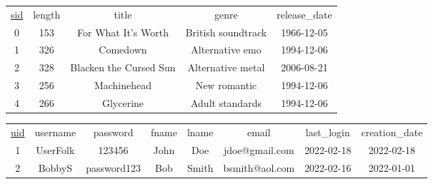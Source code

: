 \documentclass[12pt]{article}
\begin{document}
    \begin{center}
        \begin{tabular}{ |c|c|c|c|c| }
            \hline
            \rowcolor{tablegrey} \multicolumn{5}{|c|}{Song} \\
            \hline
            \underline{sid} & length & title & genre & release\_date \\
            \hline
            0 & 153 & For What It's Worth & British soundtrack & 1966-12-05 \\
            \hline
            1 & 326 & Comedown & Alternative emo & 1994-12-06 \\
            \hline
            2 & 328 & Blacken the Cursed Sun & Alternative metal & 2006-08-21 \\
            \hline
            3 & 256 & Machinehead & New romantic & 1994-12-06 \\
            \hline
            4 & 266 & Glycerine & Adult standards & 1994-12-06 \\
            \hline
        \end{tabular}
    \end{center}



        \scriptsize
        \begin{center}
            \begin{tabular}{ |c|c|c|c|c|c|c|c| }
                \hline
                \rowcolor{tablegrey} \multicolumn{8}{|c|}{User} \\
                \hline
                \underline{uid} & username & password & fname & lname & email & last\_login & creation\_date \\
                \hline
                1 & UserFolk & 123456 & John & Doe & jdoe@gmail.com & 2022-02-18 & 2022-02-18\\
                \hline
                2 & BobbyS & password123 & Bob & Smith & bsmith@aol.com & 2022-02-16 & 2022-01-01 \\
                \hline
            \end{tabular}
        \end{center}
\end{document}
